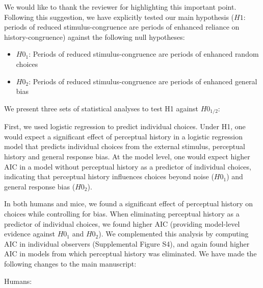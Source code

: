 \documentclass[
]{article}
\providecommand{\tightlist}{%
  \setlength{\itemsep}{0pt}\setlength{\parskip}{0pt}}
\begin{document}
We would like to thank the reviewer for highlighting this important
point. Following this suggestion, we have explicitly tested our main
hypothesis (\(H1\): periods of reduced stimulus-congruence are periods
of enhanced reliance on history-congruence) against the following null
hypotheses:

\begin{itemize}
\tightlist
\item
  \(H0_1\): Periods of reduced stimulus-congruence are periods of
  enhanced random choices
\item
  \(H0_2\): Periods of reduced stimulus-congruence are periods of
  enhanced general bias
\end{itemize}

We present three sets of statistical analyses to test H1 against
\(H0_{1/2}\):

First, we used logistic regression to predict individual choices. Under
H1, one would expect a significant effect of perceptual history in a
logistic regression model that predicts individual choices from the
external stimulus, perceptual history and general response bias. At the
model level, one would expect higher AIC in a model without perceptual
history as a predictor of individual choices, indicating that perceptual
history influences choices beyond noise (\(H0_1\)) and general response
bias (\(H0_2\)).

In both humans and mice, we found a significant effect of perceptual
history on choices while controlling for bias. When eliminating
perceptual history as a predictor of individual choices, we found higher
AIC (providing model-level evidence against \(H0_1\) and \(H0_2\)). We
complemented this analysis by computing AIC in individual observers
(Supplemental Figure S4), and again found higher AIC in models from
which perceptual history was eliminated. We have made the following
changes to the main manuscript:

Humans:
\end{document}
